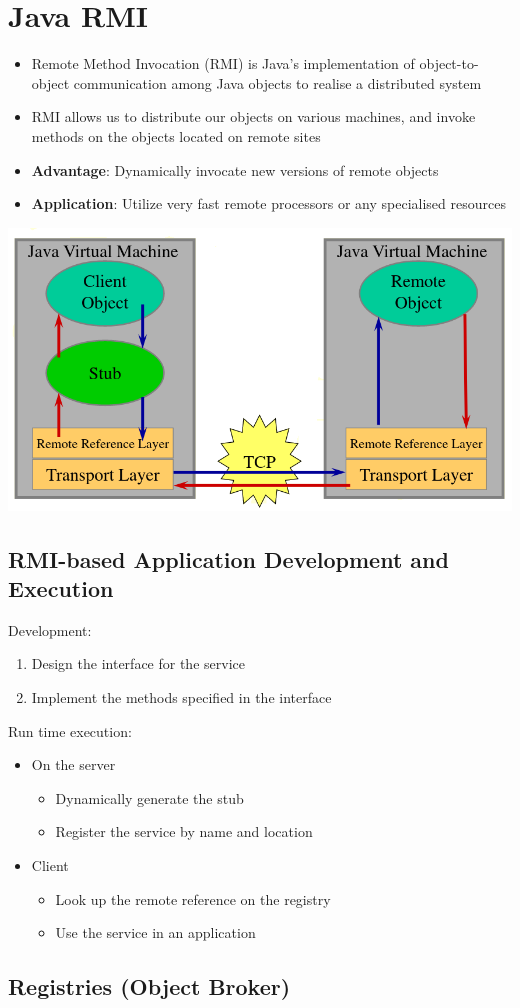 \documentclass{article}[18pt]
\begin{document}
\section{Java RMI}
\begin{itemize}
	\item Remote Method Invocation (RMI) is Java's implementation of object-to-object communication among Java objects to realise a distributed system
	\item RMI allows us to distribute our objects on various machines, and invoke methods on the objects located on remote sites
	\item \textbf{Advantage}: Dynamically invocate new versions of remote objects
	\item \textbf{Application}: Utilize very fast remote processors or any specialised resources
\end{itemize}
\begin{center}
	\includegraphics[scale=0.7]{RMI}
\end{center}
\subsection{RMI-based Application Development and Execution}
Development:
\begin{enumerate}
	\item Design the interface for the service
	\item Implement the methods specified in the interface
\end{enumerate}
Run time execution:
\begin{itemize}
	\item On the server
	\begin{itemize}
		\item Dynamically generate the stub
		\item Register the service by name and location
	\end{itemize}
	\item Client
	\begin{itemize}
		\item Look up the remote reference on the registry
		\item Use the service in an application
	\end{itemize}
\end{itemize}
\subsection{Registries (Object Broker)}
\end{document}
